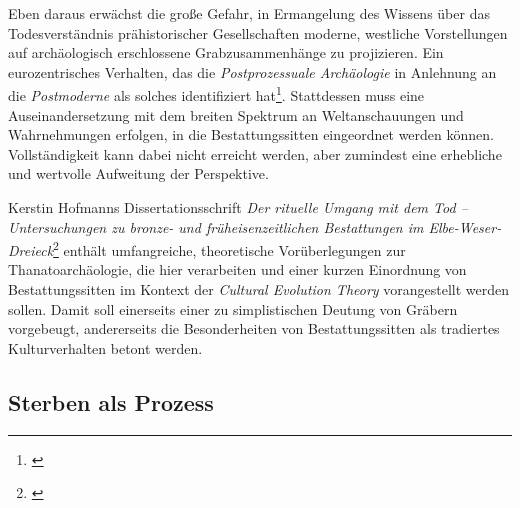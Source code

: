 \documentclass[openany,twoside,twocolumn]{book}
\let\rmarkdownfootnote\footnote%
\def\footnote{\protect\rmarkdownfootnote}
\begin{document}
Eben daraus erwächst die große Gefahr, in Ermangelung des Wissens über das Todesverständnis prähistorischer Gesellschaften moderne, westliche Vorstellungen auf archäologisch erschlossene Grabzusammenhänge zu projizieren. Ein eurozentrisches Verhalten, das die \emph{Postprozessuale Archäologie} in Anlehnung an die \emph{Postmoderne} als solches identifiziert hat\footnote{\textcite{atalay_indigenous_2006}}. Stattdessen muss eine Auseinandersetzung mit dem breiten Spektrum an Weltanschauungen und Wahrnehmungen erfolgen, in die Bestattungssitten eingeordnet werden können. Vollständigkeit kann dabei nicht erreicht werden, aber zumindest eine erhebliche und wertvolle Aufweitung der Perspektive.

Kerstin Hofmanns Dissertationsschrift \emph{Der rituelle Umgang mit dem Tod -- Untersuchungen zu bronze- und früheisenzeitlichen Bestattungen im Elbe-Weser-Dreieck}\footnote{\textcite{hofmann_rituelle_2008}} enthält umfangreiche, theoretische Vorüberlegungen zur Thanatoarchäologie, die hier verarbeiten und einer kurzen Einordnung von Bestattungssitten im Kontext der \emph{Cultural Evolution Theory} vorangestellt werden sollen. Damit soll einerseits einer zu simplistischen Deutung von Gräbern vorgebeugt, andererseits die Besonderheiten von Bestattungssitten als tradiertes Kulturverhalten betont werden.

\hypertarget{sterben-als-prozess}{%
\subsection{Sterben als Prozess}\label{sterben-als-prozess}}
\end{document}
